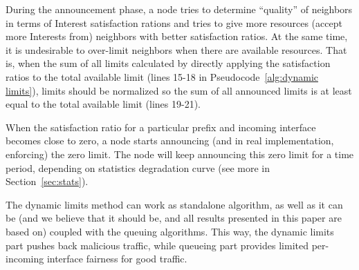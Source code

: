 During the announcement phase, a node tries to determine ``quality'' of neighbors in terms of Interest satisfaction rations and tries to give more resources (accept more Interests from) neighbors with better satisfaction ratios.
At the same time, it is undesirable to over-limit neighbors when there are available resources.
That is, when the sum of all limits calculated by directly applying the satisfaction ratios to the total available limit (lines 15-18 in Pseudocode~\ref{alg:dynamic limits}), limits should be normalized so the sum of all announced limits is at least equal to the total available limit (lines 19-21).

When the satisfaction ratio for a particular prefix and incoming interface becomes close to zero, a node starts announcing (and in real implementation, enforcing) the zero limit.
The node will keep announcing this zero limit for a time period, depending on statistics degradation curve (see more in Section~\ref{sec:stats}).

The dynamic limits method can work as standalone algorithm, as well as it can be (and we believe that it should be, and all results presented in this paper are based on) coupled with the queuing algorithms.
This way, the dynamic limits part pushes back malicious traffic, while queueing part provides limited per-incoming interface fairness for good traffic.


